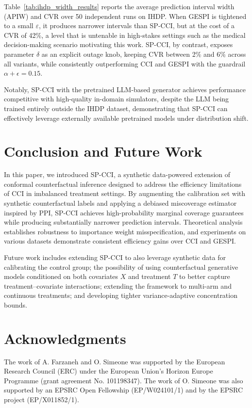 \documentclass{article}
\theoremstyle{plain}
\theoremstyle{definition}
\theoremstyle{remark}
\begin{document}
Table~\ref{tab:ihdp_width_results} reports the average prediction interval width (APIW) and CVR over 50 independent runs on IHDP. When GESPI is tightened to a small $\varepsilon$, it produces narrower intervals than SP-CCI, but at the cost of a CVR of 42\%, a level that is untenable in high-stakes settings such as the medical decision-making scenario motivating this work. SP-CCI, by contrast, exposes parameter $\delta$ as an explicit outage knob, keeping CVR between 2\% and 6\% across all variants, while consistently outperforming CCI and GESPI with the guardrail $\alpha + \epsilon = 0.15$.

Notably, SP-CCI with the pretrained LLM-based generator achieves performance competitive with high-quality in-domain simulators, despite the LLM being trained entirely outside the IHDP dataset, demonstrating that SP-CCI can effectively leverage externally available pretrained models under distribution shift.



\section{Conclusion and Future Work}
\label{sec:conclusion}

In this paper, we introduced SP-CCI, a synthetic data-powered extension of conformal counterfactual inference designed to address the efficiency limitations of CCI in imbalanced treatment settings. By augmenting the calibration set with synthetic counterfactual labels and applying a debiased miscoverage estimator inspired by PPI, SP-CCI achieves high-probability marginal coverage guarantees while producing substantially narrower prediction intervals. Theoretical analysis establishes robustness to importance weight misspecification, and experiments on various datasets demonstrate consistent efficiency gains over CCI and GESPI.

Future work includes extending SP-CCI to also leverage synthetic data for calibrating the control group; the possibility of using counterfactual generative models conditioned on both covariates $X$ and treatment $T$ to better capture treatment--covariate interactions; extending the framework to multi-arm and continuous treatments; and developing tighter variance-adaptive concentration bounds.

\section*{Acknowledgments}
The work of A. Farzaneh and O. Simeone was supported by the European Research Council (ERC) under the European Union’s Horizon Europe Programme (grant agreement No. 101198347). The work of O. Simeone was also supported by an EPSRC Open Fellowship (EP/W024101/1) and by the EPSRC project (EP/X011852/1).
\end{document}
